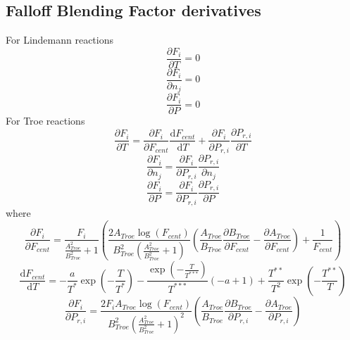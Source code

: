 \documentclass[a4paper,10pt]{article}
\begin{document}
\subsection{Falloff Blending Factor derivatives}

 For Lindemann reactions
\begin{dmath} \frac{\partial F_{i} }{\partial T } = 0\end{dmath} 
\begin{dmath} \frac{\partial F_{i} }{\partial {n_j} } = 0\end{dmath} 
\begin{dmath} \frac{\partial F_{i} }{\partial P } = 0\end{dmath} 
For Troe reactions
\begin{dmath} \frac{\partial F_{i} }{\partial T } = \frac{\partial F_{i} }{\partial F_{cent} } \frac{\text{d} F_{cent} }{\text{d} T } + \frac{\partial F_{i} }{\partial P_{r, i} } \frac{\partial P_{r, i} }{\partial T }\end{dmath} 
\begin{dmath} \frac{\partial F_{i} }{\partial {n_j} } = \frac{\partial F_{i} }{\partial P_{r, i} } \frac{\partial P_{r, i} }{\partial {n_j} }\end{dmath} 
\begin{dmath} \frac{\partial F_{i} }{\partial P } = \frac{\partial F_{i} }{\partial P_{r, i} } \frac{\partial P_{r, i} }{\partial P }\end{dmath} 
where
\begin{dmath} \frac{\partial F_{i} }{\partial F_{cent} } = \frac{F_{i}}{\frac{A_{Troe}^{2}}{B_{Troe}^{2}} + 1} \left(\frac{2 A_{Troe} \log{\left (F_{cent} \right )}}{B_{Troe}^{2} \left(\frac{A_{Troe}^{2}}{B_{Troe}^{2}} + 1\right)} \left(\frac{A_{Troe}}{B_{Troe}} \frac{\partial B_{Troe} }{\partial F_{cent} } - \frac{\partial A_{Troe} }{\partial F_{cent} }\right) + \frac{1}{F_{cent}}\right)\end{dmath} 
\begin{dmath} \frac{\text{d} F_{cent} }{\text{d} T } = - \frac{a}{T^{*}} \operatorname{exp}\left({- \frac{T}{T^{*}}}\right) - \frac{\operatorname{exp}\left({- \frac{T}{T^{***}}}\right)}{T^{***}} \left(- a + 1\right) + \frac{T^{**}}{T^{2}} \operatorname{exp}\left({- \frac{T^{**}}{T}}\right)\end{dmath} 
\begin{dmath} \frac{\partial F_{i} }{\partial P_{r, i} } = \frac{2 F_{i} A_{Troe} \log{\left (F_{cent} \right )}}{B_{Troe}^{2} \left(\frac{A_{Troe}^{2}}{B_{Troe}^{2}} + 1\right)^{2}} \left(\frac{A_{Troe}}{B_{Troe}} \frac{\partial B_{Troe} }{\partial P_{r, i} } - \frac{\partial A_{Troe} }{\partial P_{r, i} }\right)\end{dmath} 
\end{document}
